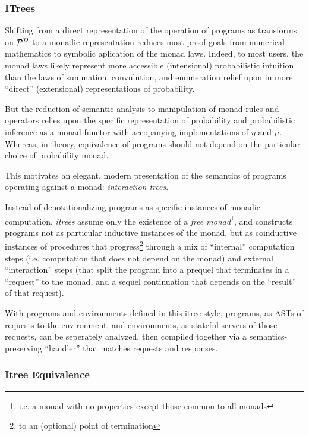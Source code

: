\documentclass{article}
\begin{document}
\subsubsection{ITrees}


Shifting from a direct representation of the operation of \AIM programs as transforms on $\mathcal{P}^{\mathcal{D}}$ to a monadic representation reduces most proof goals from numerical mathematics to symbolic aplication of the monad laws. Indeed, to most users, the monad laws likely represent more accessible (intensional) probabilistic intuition than the laws of summation, convulution, and enumeration relief upon in more ``direct'' (extensional) representations of probability.

But the reduction of \AIM semantic analysis to manipulation of monad rules and operators relies upon the specific representation of probability and probabilistic inference as a monad functor with accopanying implementations of $\eta$ and $\mu$. Whereas, in theory, equivalence of \AIM programs should not depend on the particular choice of probability monad.

This motivates an elegant, modern presentation of the semantics of programs operating against a monad: \textit{interaction trees}.

Instead of denotationalizing programs as specific instances of monadic computation, \textit{itrees} assume only the existence of a \textit{free monad}\footnote{i.e. a monad with no properties except those common to all monads}, and constructs programs not as particular inductive instances of the monad, but as coinductive instances of procedures that progress\footnote{to an (optional) point of termination} through a mix of ``internal'' computation steps (i.e. computation that does not depend on the monad) and external ``interaction'' steps (that split the program into a prequel that terminates in a ``request'' to the monad, and a sequel continuation that depends on the ``result'' of that request).

With programs and environments defined in this itree style, programs, as ASTs of requests to the environment, and environments, as stateful servers of those requests, can be seperately analyzed, then compiled together via a semantics-preserving ``handler'' that matches requests and responses. 

\subsubsection{Itree Equivalence}
\end{document}
